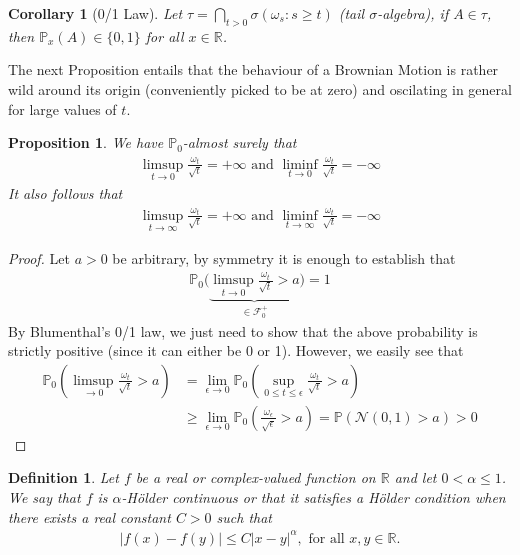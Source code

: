 \documentclass[11pt,a4paper, final]{article}
\newtheorem{prop}{Proposition}[section]
\newtheorem{cor}{Corollary}[section]
\newtheorem{defn}{Definition}[section]
\theoremstyle{definition}
\begin{document}
\begin{cor}[0/1 Law] Let $\tau = \displaystyle \bigcap_{t >0} \sigma( \omega_s : s \geq t )$ (tail $\sigma$-algebra), if $A \in \tau$, then $\mathbb{P}_x(A) \in \lbrace 0 , 1 \rbrace$ for all $ x \in \mathbb{R}$. 
\end{cor}
\noindent The next Proposition entails that the behaviour of a Brownian Motion is rather wild around its origin (conveniently picked to be at zero) and oscilating in general for large values of $t$. 
\begin{prop} We have $\mathbb{P}_0$-almost surely that 
\begin{align*}
\limsup_{t \to 0} \frac{\omega_t}{\sqrt{t}} = + \infty \text{ and } \liminf_{t \to 0} \frac{\omega_t}{\sqrt{t}}= - \infty
\end{align*}
It also follows that 
\begin{align*}
\limsup_{t \to \infty}  \frac{\omega_t}{\sqrt{t}}= + \infty \text{ and } \liminf_{t \to \infty} \frac{\omega_t}{\sqrt{t}} = - \infty 
\end{align*}
\end{prop}
\begin{proof}
Let $a >0$ be arbitrary, by symmetry it is enough to establish that 
\begin{align*}
\mathbb{P}_0 \Big( \underbrace{\limsup_{t \to 0} \frac{\omega_t}{\sqrt{t}} > a}_{ \in \mathcal{F}_0^+} \Big) = 1
\end{align*}
By Blumenthal's 0/1 law, we just need to show that the above probability is strictly positive (since it can either be 0 or 1). However, we easily see that 
\begin{align*}
\mathbb{P}_0 \left( \limsup_{ \to 0} \frac{\omega_t}{\sqrt{t}} > a \right) & = \lim_{ \epsilon \to 0} \mathbb{P}_0 \left( \sup_{0 \leq t \leq \epsilon} \frac{\omega_t}{\sqrt{t}} >a \right) \\
& \geq \lim_{ \epsilon \to 0 } \mathbb{P}_0 \left( \frac{\omega_\epsilon}{\sqrt{\epsilon}} > a \right) = \mathbb{P}( \mathcal{N}(0,1) >a)>0 
\end{align*}
\end{proof}
\newpage
\begin{defn} Let $f$ be a real or complex-valued function on $\mathbb{R}$ and let $ 0 < \alpha \leq 1$. We say that $f$ is $\alpha$-Hölder continuous or that it satisfies a Hölder condition when there exists a real constant $C>0$ such that  
\begin{align*}
|f(x)-f(y)| \leq C |x-y|^\alpha, \text{ for all } x ,y \in \mathbb{R}.
\end{align*}
\end{defn}
\end{document}
